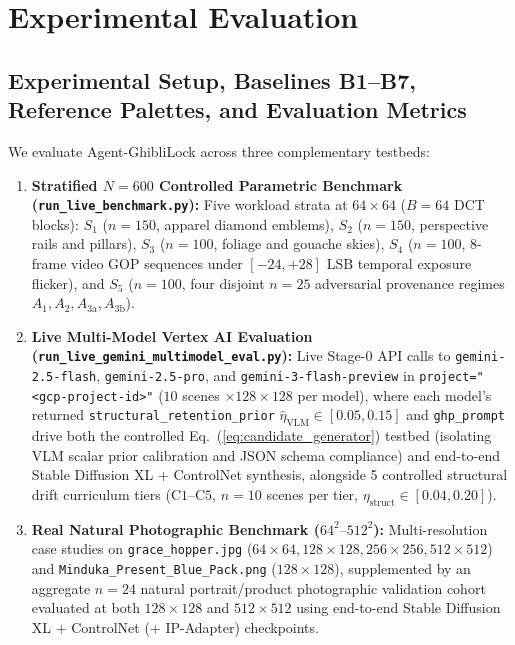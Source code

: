 \documentclass[conference,10pt]{IEEEtran}
\begin{document}
\section{Experimental Evaluation}
\label{sec:experiments}

\subsection{Experimental Setup, Baselines B1--B7, Reference Palettes, and Evaluation Metrics}
We evaluate Agent-GhibliLock across three complementary testbeds:
\begin{enumerate}
    \item \textbf{Stratified $N=600$ Controlled Parametric Benchmark (\texttt{run\_live\_benchmark.py}):} Five workload strata at $64\times 64$ ($B=64$ DCT blocks): $S_1$ ($n=150$, apparel diamond emblems), $S_2$ ($n=150$, perspective rails and pillars), $S_3$ ($n=100$, foliage and gouache skies), $S_4$ ($n=100$, 8-frame video GOP sequences under $[-24, +28]\text{ LSB}$ temporal exposure flicker), and $S_5$ ($n=100$, four disjoint $n=25$ adversarial provenance regimes $A_1, A_2, A_{3\text{a}}, A_{3\text{b}}$).
    \item \textbf{Live Multi-Model Vertex AI Evaluation (\texttt{run\_live\_gemini\_multimodel\_eval.py}):} Live Stage-0 API calls to \texttt{gemini-2.5-flash}, \texttt{gemini-2.5-pro}, and \texttt{gemini-3-flash-preview} in \texttt{project="<gcp-project-id>"} ($10$ scenes $\times 128\times 128$ per model), where each model's returned \texttt{structural\_retention\_prior} $\hat{\eta}_{\text{VLM}} \in [0.05, 0.15]$ and \texttt{ghp\_prompt} drive both the controlled Eq.~(\ref{eq:candidate_generator}) testbed (isolating VLM scalar prior calibration and JSON schema compliance) and end-to-end Stable Diffusion XL + ControlNet synthesis, alongside 5 controlled structural drift curriculum tiers ($\text{C1}\text{--}\text{C5}$, $n=10$ scenes per tier, $\eta_{\text{struct}} \in [0.04, 0.20]$).
    \item \textbf{Real Natural Photographic Benchmark ($64^2\text{--}512^2$):} Multi-resolution case studies on \texttt{grace\_hopper.jpg} ($64\times 64, 128\times 128, 256\times 256, 512\times 512$) and \texttt{Minduka\_Present\_Blue\_Pack.png} ($128\times 128$), supplemented by an aggregate $n=24$ natural portrait/product photographic validation cohort evaluated at both $128\times 128$ and $512\times 512$ using end-to-end Stable Diffusion XL + ControlNet (+ IP-Adapter) checkpoints.
\end{enumerate}
\end{document}
